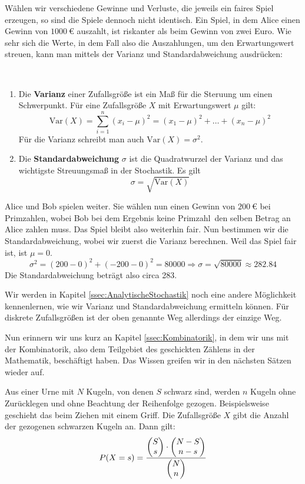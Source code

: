 \documentclass[ngerman, 12pt]{nssheetxea}
\begin{document}
Wählen wir verschiedene Gewinne und Verluste, die jeweils ein faires Spiel erzeugen, so sind die Spiele dennoch nicht identisch. Ein Spiel, in dem Alice einen Gewinn von $\SI{1000}{\euro}$ auszahlt, ist riskanter als beim Gewinn von zwei Euro. Wie sehr sich die Werte, in dem Fall also die Auszahlungen, um den Erwartungswert streuen, kann man mittels der Varianz und Standardabweichung ausdrücken:

\begin{definition} \ \par
\begin{enumerate}
\item Die \textbf{Varianz} einer Zufallsgröße ist ein Maß für die Steruung um einen Schwerpunkt. Für eine Zufallsgröße $X$ mit Erwartungswert $\mu$ gilt:
\[ \mathrm{Var}(X) = \sum_{i=1}^n (x_i-\mu)^2 = (x_1-\mu)^2+\ldots + (x_n-\mu)^2  \]
Für die Varianz schreibt man auch $\mathrm{Var}(X)=\sigma^2$.
\item Die \textbf{Standardabweichung} $\sigma$ ist die Quadratwurzel der Varianz und das wichtigste Streuungsmaß in der Stochastik. Es gilt
\[ \sigma = \sqrt{\mathrm{Var}(X)}  \]
\end{enumerate}
\end{definition}

\begin{example}
Alice und Bob spielen weiter. Sie wählen nun einen Gewinn von $\SI{200}{\euro}$ bei Primzahlen, wobei Bob bei dem Ergebnis \glqq keine Primzahl\grqq \ den selben Betrag an Alice zahlen muss. Das Spiel bleibt also weiterhin fair. Nun bestimmen wir die Standardabweichung, wobei wir zuerst die Varianz berechnen. Weil das Spiel fair ist, ist $\mu = 0$.
\[ \sigma^2 = (200-0)^2+(-200-0)^2 = 80000 \Rightarrow \sigma = \sqrt{80000} \approx \num{282,84} \]
Die Standardabweichung beträgt also circa 283.
\end{example}
Wir werden in Kapitel \ref{ssec:AnalytischeStochastik} noch eine andere Möglichkeit kennenlernen, wie wir Varianz und Standardabweichung ermitteln können. Für diskrete Zufallsgrößen ist der oben genannte Weg allerdings der einzige Weg. \par
Nun erinnern wir uns kurz an Kapitel \ref{ssec:Kombinatorik}, in dem wir uns mit der Kombinatorik, also dem Teilgebiet des geschickten Zählens in der Mathematik, beschäftigt haben. Das Wissen greifen wir in den nächsten Sätzen wieder auf.

\begin{theorem}
Aus einer Urne mit $N$ Kugeln, von denen $S$ schwarz sind, werden $n$ Kugeln ohne Zurücklegen und ohne Beachtung der Reihenfolge gezogen. Beispielsweise geschieht das beim Ziehen mit einem Griff. Die Zufallsgröße $X$ gibt die Anzahl der gezogenen schwarzen Kugeln an. Dann gilt:
\[ P(X=s)=\dfrac{\colvec{S}{s} \cdot \colvec{N-S}{n-s}}{\colvec{N}{n}}  \]
\label{Satz:UrneSchwarzWeißKeine Reihenfolge}
\end{theorem}
\end{document}
